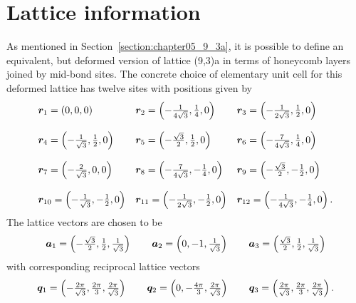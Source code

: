 \section{Lattice information}
\label{section:chapter06_Lattice}
%
%
As mentioned in Section~\ref{section:chapter05_9_3a}, it is possible to define an equivalent, but deformed version of lattice (9,3)a in terms of honeycomb layers joined by mid-bond sites.
The concrete choice of elementary unit cell for this deformed lattice has twelve sites with positions given by
%
\begin{equation}
	\begin{matrix*}[l]
		\br_1 = \left(0, 0, 0\right) &
		\br_2 = \left(-\frac{1}{4\sqrt{3}}, \frac{1}{4}, 0\right) &
		\br_3 = \left(-\frac{1}{2\sqrt{3}}, \frac{1}{2}, 0\right) \\
		&\\
		\br_4 = \left(-\frac{1}{\sqrt{3}}, \frac{1}{2}, 0\right) &
		\br_5 = \left(-\frac{\sqrt{3}}{2}, \frac{1}{2}, 0\right) &
		\br_6 = \left(-\frac{7}{4\sqrt{3}}, \frac{1}{4}, 0\right) \\
		&\\
		\br_7 = \left(-\frac{2}{\sqrt{3}}, 0, 0\right) &
		\br_8 = \left(-\frac{7}{4\sqrt{3}}, -\frac{1}{4}, 0\right) &
		\br_9 = \left(-\frac{\sqrt{3}}{2}, -\frac{1}{2}, 0\right) \\
		&\\
		\br_{10} = \left(-\frac{1}{\sqrt{3}}, -\frac{1}{2}, 0\right) &
		\br_{11} = \left(-\frac{1}{2\sqrt{3}}, -\frac{1}{2}, 0\right) &
		\br_{12} = \left(-\frac{1}{4\sqrt{3}}, -\frac{1}{4}, 0\right).
	\end{matrix*}
\end{equation}
%
The lattice vectors are chosen to be
%
\begin{equation}
	\begin{matrix*}[l]
		\ba_1 = \left(-\frac{\sqrt{3}}{2}, \frac{1}{2}, \frac{1}{\sqrt{3}}\right) \qquad
		\ba_2 = \left(0, -1, \frac{1}{\sqrt{3}}\right) \qquad
		\ba_3 = \left(\frac{\sqrt{3}}{2}, \frac{1}{2}, \frac{1}{\sqrt{3}}\right)
	\end{matrix*}
\end{equation}
%
with corresponding reciprocal lattice vectors
%
\begin{equation}
	\begin{matrix*}[l]
		\bq_1 = \left(-\frac{2\pi}{\sqrt{3}}, \frac{2\pi}{3}, \frac{2\pi}{\sqrt{3}}\right) \qquad
		\bq_2 = \left(0, -\frac{4\pi}{3}, \frac{2\pi}{\sqrt{3}}\right) \qquad
		\bq_3 = \left(\frac{2\pi}{\sqrt{3}}, \frac{2\pi}{3}, \frac{2\pi}{\sqrt{3}}\right).
	\end{matrix*}
\end{equation}
%


